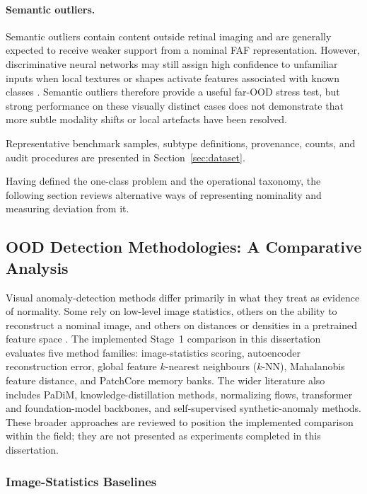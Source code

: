\documentclass[fleqn,12pt]{olplainarticle}
\begin{document}
\paragraph{Semantic outliers.}
Semantic outliers contain content outside retinal imaging and are generally expected to receive weaker support from a nominal FAF representation. However, discriminative neural networks may still assign high confidence to unfamiliar inputs when local textures or shapes activate features associated with known classes \cite{nguyen2015deep,hendrycks2017baseline}. Semantic outliers therefore provide a useful far-OOD stress test, but strong performance on these visually distinct cases does not demonstrate that more subtle modality shifts or local artefacts have been resolved.

Representative benchmark samples, subtype definitions, provenance, counts, and audit procedures are presented in Section~\ref{sec:dataset}.

Having defined the one-class problem and the operational taxonomy, the following section reviews alternative ways of representing nominality and measuring deviation from it.

\subsection{OOD Detection Methodologies: A Comparative Analysis}
\label{sec:methods}

Visual anomaly-detection methods differ primarily in what they treat as evidence of normality. Some rely on low-level image statistics, others on the ability to reconstruct a nominal image, and others on distances or densities in a pretrained feature space \cite{ruff2021unifying,yang2024generalized,hong2024medicalood}. The implemented Stage~1 comparison in this dissertation evaluates five method families: image-statistics scoring, autoencoder reconstruction error, global feature $k$-nearest neighbours ($k$-NN), Mahalanobis feature distance, and PatchCore memory banks. The wider literature also includes PaDiM, knowledge-distillation methods, normalizing flows, transformer and foundation-model backbones, and self-supervised synthetic-anomaly methods. These broader approaches are reviewed to position the implemented comparison within the field; they are not presented as experiments completed in this dissertation.

\subsubsection{Image-Statistics Baselines}
\end{document}
